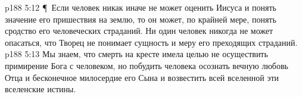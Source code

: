 \vs p188 5:12 \P\ Если человек никак иначе не может оценить Иисуса и понять значение его пришествия на землю, то он может, по крайней мере, понять сродство его человеческих страданий. Ни один человек никогда не может опасаться, что Творец не понимает сущность и меру его преходящих страданий.
\vs p188 5:13 Мы знаем, что смерть на кресте имела целью не осуществить примирение Бога с человеком, но побудить человека осознать вечную любовь Отца и бесконечное милосердие его Сына и возвестить всей вселенной эти вселенские истины.
